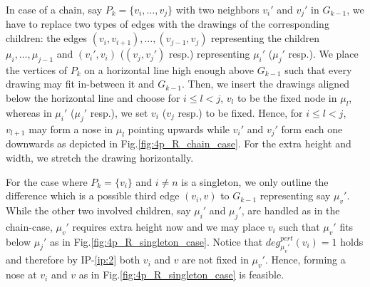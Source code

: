 \documentclass[a4paper,twoside,11pt]{article}
\newcommand{\pdeg}[2]{\textit{deg}^{\textit{pert}}_{#1}(#2)}
\newcommand{\IPFix}{IP-\ref{ip:2}\xspace}
\begin{document}
\begin{description}
In case of a chain, say $P_k = \{ v_i, \ldots, v_j \}$ with two
neighbors $v_{i}'$ and $v_{j}'$ in $G_{k-1}$, we have to replace two
types of edges with the drawings of the corresponding children: the
edges $(v_i, v_{i+1}), \ldots, (v_{j-1}, v_{j})$ representing the
children $\mu_i, \ldots, \mu_{j-1}$ and $(v_{i}', v_{i})$ ($(v_{j},
v_{j}')$ resp.) representing $\mu_{i}'$ ($\mu_{j}'$ resp.). We place
the vertices of $P_k$ on a horizontal line high enough above
$G_{k-1}$ such that every drawing may fit in-between it and
$G_{k-1}$. Then, we insert the drawings aligned below the horizontal
line and choose for $i \leq l < j$, $v_{l}$ to be the fixed node in
$\mu_{l}$, whereas in $\mu_{i}'$ ($\mu_{j}'$ resp.), we set $v_{i}$
($v_j$ resp.) to be fixed. Hence, for $i \leq l < j$, $v_{l+1}$ may
form a nose in $\mu_{l}$ pointing upwards while $v_{i}'$ and
$v_{j}'$ form each one downwards as depicted in
Fig.\ref{fig:4p_R_chain_case}. For the extra height and width, we
stretch the drawing horizontally.

For the case where $P_k = \{ v_i \}$ and $i \neq n$ is a singleton,
we only outline the difference which is a possible third edge $(v_i,
v)$ to $G_{k-1}$ representing say $\mu_{v}'$. While the other two
involved children, say  $\mu_{i}'$ and $\mu_{j}'$, are handled as in
the chain-case, $\mu_{v}'$ requires extra height now and we may
place $v_i$ such that $\mu_{v}'$ fits below $\mu_{j}'$ as in
Fig.\ref{fig:4p_R_singleton_case}. Notice that $\pdeg{\mu_{v}'}{v_i}
= 1$ holds and therefore by \IPFix both $v_i$ and $v$ are not fixed
in $\mu_{v}'$. Hence, forming a nose at $v_i$ and $v$ as in
Fig.\ref{fig:4p_R_singleton_case} is feasible.


\end{description}
\end{document}
